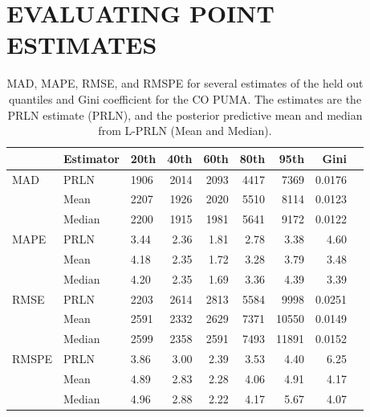 \documentclass[12pt]{article}
\begin{document}
\clearpage

\section{EVALUATING POINT ESTIMATES}\label{app:acstab}
\setcounter{table}{0}
\begin{table}[ht]
  \centering
  \begin{tabular}{lllrrrrrr}
    \hline
          & Estimator & 20th & 40th & 60th & 80th & 95th & Gini \\
    \hline
    MAD   & PRLN         & 1906 & 2014 & 2093 & 4417 & 7369 & 0.0176 \\
          & Mean         & 2207 & 1926 & 2020 & 5510 & 8114 & 0.0123 \\
          & Median       & 2200 & 1915 & 1981 & 5641 & 9172 & 0.0122 \\\hline
    MAPE  & PRLN         & 3.44 & 2.36 & 1.81 & 2.78 & 3.38 & 4.60 \\
          & Mean         & 4.18 & 2.35 & 1.72 & 3.28 & 3.79 & 3.48 \\
          & Median       & 4.20 & 2.35 & 1.69 & 3.36 & 4.39 & 3.39 \\\hline
    RMSE  & PRLN         & 2203 & 2614 & 2813 & 5584 & 9998  & 0.0251 \\
          & Mean         & 2591 & 2332 & 2629 & 7371 & 10550 & 0.0149 \\
          & Median       & 2599 & 2358 & 2591 & 7493 & 11891 & 0.0152 \\\hline
    RMSPE & PRLN         & 3.86 & 3.00 & 2.39 & 3.53 & 4.40 & 6.25 \\
          & Mean         & 4.89 & 2.83 & 2.28 & 4.06 & 4.91 & 4.17 \\
          & Median       & 4.96 & 2.88 & 2.22 & 4.17 & 5.67 & 4.07 \\
    \hline
  \end{tabular}
  \caption{MAD, MAPE, RMSE, and RMSPE for several estimates of the held out quantiles and Gini coefficient for the CO PUMA. The estimates are the PRLN estimate (PRLN), and the posterior predictive mean and median from L-PRLN (Mean and Median).}
  \label{tab:co.metric}
\end{table}
\end{document}
